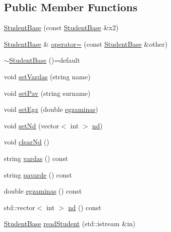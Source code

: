 \subsection*{Public Member Functions}
\begin{DoxyCompactItemize}
\item 
\mbox{\hyperlink{class_student_base_aa03be154c85a6ed0a4b946a8af9be7f7}{Student\+Base}} (const \mbox{\hyperlink{class_student_base}{Student\+Base}} \&x2)
\item 
\mbox{\hyperlink{class_student_base}{Student\+Base}} \& \mbox{\hyperlink{class_student_base_a33492cade3cb6912b66b0aaac26ca0bc}{operator=}} (const \mbox{\hyperlink{class_student_base}{Student\+Base}} \&other)
\item 
\mbox{\hyperlink{class_student_base_ad909509549288293e4af9ed332c5b156}{$\sim$\+Student\+Base}} ()=default
\item 
void \mbox{\hyperlink{class_student_base_ad3d2ec87d8481a846d06fbdaae88aec1}{set\+Vardas}} (string name)
\item 
void \mbox{\hyperlink{class_student_base_a640675f1b05262dd1acaa798c2259675}{set\+Pav}} (string surname)
\item 
void \mbox{\hyperlink{class_student_base_a62a8e545c6f0a53d1af6508856bbf670}{set\+Egz}} (double \mbox{\hyperlink{class_student_base_a250eda1d2180e7d61ca3f3930417cf06}{egzaminas}})
\item 
void \mbox{\hyperlink{class_student_base_abca77bf7b90c9c6ad94975cbbb34979d}{set\+Nd}} (vector$<$ int $>$ \mbox{\hyperlink{class_student_base_aff680a22b1f9240273612335b94f58c4}{nd}})
\item 
void \mbox{\hyperlink{class_student_base_a3776b744979f4f34968ef407503f44a8}{clear\+Nd}} ()
\item 
string \mbox{\hyperlink{class_student_base_a6fe791399496f3b4b0c9d910472b2232}{vardas}} () const
\item 
string \mbox{\hyperlink{class_student_base_adc52417e044a31212359ea106fe81236}{pavarde}} () const
\item 
double \mbox{\hyperlink{class_student_base_a250eda1d2180e7d61ca3f3930417cf06}{egzaminas}} () const
\item 
std\+::vector$<$ int $>$ \mbox{\hyperlink{class_student_base_aff680a22b1f9240273612335b94f58c4}{nd}} () const
\item 
\mbox{\hyperlink{class_student_base}{Student\+Base}} \mbox{\hyperlink{class_student_base_a697cb5bf22e2e43772c9b52a32d4b7f2}{read\+Student}} (std\+::istream \&in)
\end{DoxyCompactItemize}
